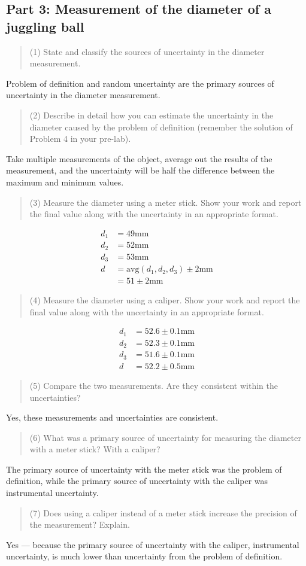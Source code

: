 \documentclass[8pt]{extarticle}
\newcommand{\plain}[1]{\textrm{#1}}
\begin{document}
\subsection*{Part 3: Measurement of the diameter of a juggling ball}
\begin{quote}
	(1) State and classify the sources of uncertainty in the diameter measurement. 
\end{quote}
Problem of definition and random uncertainty are the primary sources of uncertainty in the diameter measurement.
\begin{quote}
	(2) Describe in detail how you can estimate the uncertainty in the diameter caused by the problem of definition (remember the solution of Problem 4 in your pre-lab).
\end{quote}
Take multiple measurements of the object, average out the results of the measurement, and the uncertainty will be half the difference between the maximum and minimum values.
\begin{quote}
	(3) Measure the diameter using a meter stick. Show your work and report the final value along with the uncertainty in an appropriate format.
\end{quote}
\begin{align*}
	d_1 &= 49\plain{mm}\\
	d_2 &= 52\plain{mm}\\
	d_3 &= 53\plain{mm}\\
	d &= \plain{avg}(d_1,d_2,d_3) \pm 2\plain{mm}\\
	&= 51 \pm 2\plain{mm}
\end{align*}
\begin{quote}
	(4) Measure the diameter using a caliper. Show your work and report the final value along with the uncertainty in an appropriate format.
\end{quote}
\begin{align*}
	d_1 &= 52.6 \pm 0.1\plain{mm}\\
	d_2 &= 52.3 \pm 0.1\plain{mm}\\
	d_3 &= 51.6 \pm 0.1\plain{mm}\\
	d &= 52.2 \pm 0.5\plain{mm}
\end{align*}
\begin{quote}
	(5) Compare the two measurements. Are they consistent within the uncertainties? 
\end{quote}
Yes, these measurements and uncertainties are consistent.
\begin{quote}
	(6) What was a primary source of uncertainty for measuring the diameter with a meter stick? With a caliper?
\end{quote}
The primary source of uncertainty with the meter stick was the problem of definition, while the primary source of uncertainty with the caliper was instrumental uncertainty.
\begin{quote}
	(7) Does using a caliper instead of a meter stick increase the precision of the measurement? Explain.
\end{quote}
Yes — because the primary source of uncertainty with the caliper, instrumental uncertainty, is much lower than uncertainty from the problem of definition.
\end{document}
